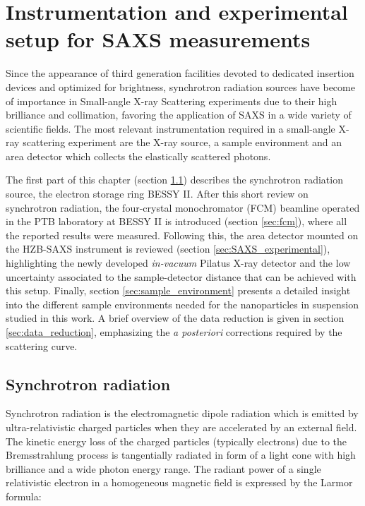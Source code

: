 \chapter{Instrumentation and experimental setup for SAXS measurements}
\label{chap:experimental_setup}

Since the appearance of third generation facilities devoted to dedicated insertion devices and optimized for brightness, synchrotron radiation sources have become of importance in Small-angle X-ray Scattering experiments due to their high brilliance and collimation, favoring the application of SAXS in a wide variety of scientific fields. The most relevant instrumentation required in a small-angle X-ray scattering experiment are the X-ray source, a sample environment and an area detector which collects the elastically scattered photons. 

The first part of this chapter (section \ref{sec:BESSY}) describes the synchrotron radiation source, the electron storage ring BESSY II. After this short review on synchrotron radiation, the four-crystal monochromator (FCM) beamline operated in the PTB laboratory at BESSY II is introduced (section \ref{sec:fcm}), where all the reported results were measured. Following this, the area detector mounted on the HZB-SAXS instrument is reviewed (section \ref{sec:SAXS_experimental}), highlighting the newly developed \emph{in-vacuum} Pilatus X-ray detector and the low uncertainty associated to the sample-detector distance that can be achieved with this setup. Finally, section \ref{sec:sample_environment} presents a detailed insight into the different sample environments needed for the nanoparticles in suspension studied in this work. A brief overview of the data reduction is given in section \ref{sec:data_reduction}, emphasizing the \emph{a posteriori} corrections required by the scattering curve.


\section{Synchrotron radiation}
\label{sec:BESSY}

Synchrotron radiation is the electromagnetic dipole radiation which is emitted by ultra-relativistic charged particles when they are accelerated by an external field. The kinetic energy loss of the charged particles (typically electrons) due to the Bremsstrahlung process \citep{blumenthal_bremsstrahlung_1970} is tangentially radiated in form of a light cone with high brilliance and a wide photon energy range. The radiant power of a single relativistic electron in a homogeneous magnetic field is expressed by the Larmor formula:

